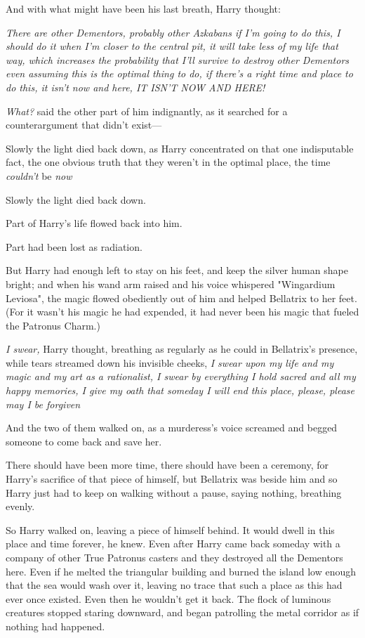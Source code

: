 And with what might have been his last breath, Harry thought:

\emph{There are other Dementors, probably other Azkabans{\el} if I'm going
to do this, I should do it when I'm closer to the central pit, it will take
less of my life that way, which increases the probability that I'll survive to
destroy other Dementors{\el} even assuming this is the optimal thing to do,
if there's a right time and place to do this, it isn't now and here, IT ISN'T
NOW AND HERE!}

\emph{What?} said the other part of him indignantly, as it searched for a
counterargument that didn't exist—

Slowly the light died back down, as Harry concentrated on that one indisputable
fact, the one obvious truth that they weren't in the optimal place, the time
\emph{couldn't} be \emph{now{\el}}

Slowly the light died back down.

Part of Harry's life flowed back into him.

Part had been lost as radiation.

But Harry had enough left to stay on his feet, and keep the silver human shape
bright; and when his wand arm raised and his voice whispered "Wingardium
Leviosa", the magic flowed obediently out of him and helped Bellatrix to her
feet. (For it wasn't his magic he had expended, it had never been his magic
that fueled the Patronus Charm.)

\emph{I swear,} Harry thought, breathing as regularly as he could in
Bellatrix's presence, while tears streamed down his invisible cheeks, \emph{I
swear upon my life and my magic and my art as a rationalist, I swear by
everything I hold sacred and all my happy memories, I give my oath that someday
I will end this place, please, please may I be forgiven{\el}}

And the two of them walked on, as a murderess's voice screamed and begged
someone to come back and save her.

There should have been more time, there should have been a ceremony, for
Harry's sacrifice of that piece of himself, but Bellatrix was beside him and so
Harry just had to keep on walking without a pause, saying nothing, breathing
evenly.

So Harry walked on, leaving a piece of himself behind. It would dwell in this
place and time forever, he knew. Even after Harry came back someday with a
company of other True Patronus casters and they destroyed all the Dementors
here. Even if he melted the triangular building and burned the island low
enough that the sea would wash over it, leaving no trace that such a place as
this had ever once existed. Even then he wouldn't get it back.
\sbreak
The flock of luminous creatures stopped staring downward, and began patrolling
the metal corridor as if nothing had happened.

